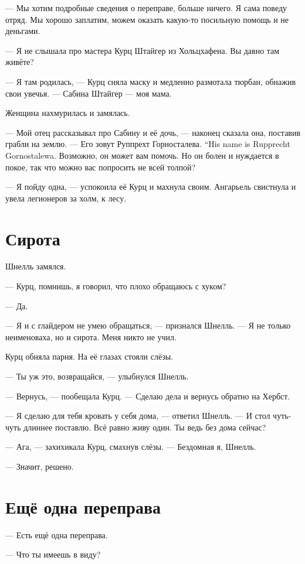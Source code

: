 --- Мы хотим подробные сведения о переправе, больше ничего.
Я сама поведу отряд.
Мы хорошо заплатим, можем оказать какую-то посильную помощь и не деньгами.

--- Я не слышала про мастера Курц Штайгер из Хольцхафена.
Вы давно там живёте?

--- Я там родилась, --- Курц сняла маску и медленно размотала тюрбан, обнажив свои увечья.
--- Сабина Штайгер --- моя мама.

Женщина нахмурилась и замялась.

--- Мой отец рассказывал про Сабину и её дочь, --- наконец сказала она, поставив грабли на землю.
{--- Его зовут Руппрехт Горносталева.}
{``His name is Rupprecht Gornostalewa.}
Возможно, он может вам помочь.
Но он болен и нуждается в покое, так что можно вас попросить не всей толпой?

--- Я пойду одна, --- успокоила её Курц и махнула своим.
Ангарьель свистнула и увела легионеров за холм, к лесу.

\section{Сирота}

Шнелль замялся.

--- Курц, помнишь, я говорил, что плохо обращаюсь с хуком?

--- Да.

--- Я и с глайдером не умею обращаться, --- признался Шнелль.
--- Я не только неименоваха, но и сирота.
Меня никто не учил.

Курц обняла парня.
На её глазах стояли слёзы.

--- Ты уж это, возвращайся, --- улыбнулся Шнелль.

--- Вернусь, --- пообещала Курц.
--- Сделаю дела и вернусь обратно на Хербст.

--- Я сделаю для тебя кровать у себя дома, --- ответил Шнелль.
--- И стол чуть-чуть длиннее поставлю.
Всё равно живу один.
Ты ведь без дома сейчас?

--- Ага, --- захихикала Курц, смахнув слёзы.
--- Бездомная я, Шнелль.

--- Значит, решено.

\section{Ещё одна переправа}

--- Есть ещё одна переправа.

--- Что ты имеешь в виду?

